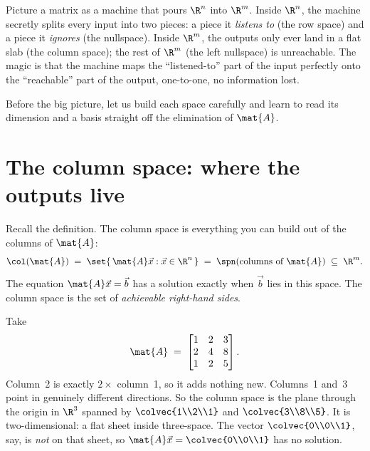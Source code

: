 \begin{intuitionbox}
Picture a matrix as a machine that pours $\R^n$ into $\R^m$. Inside $\R^n$, the machine secretly
splits every input into two pieces: a piece it \emph{listens to} (the row space) and a piece it
\emph{ignores} (the nullspace). Inside $\R^m$, the outputs only ever land in a flat slab (the
column space); the rest of $\R^m$ (the left nullspace) is unreachable. The magic is that the
machine maps the ``listened-to'' part of the input perfectly onto the ``reachable'' part of the
output, one-to-one, no information lost.
\end{intuitionbox}

Before the big picture, let us build each space carefully and learn to read its dimension and a
basis straight off the elimination of $\mat{A}$.

\section{The column space: where the outputs live}

Recall the definition. The column space is everything you can build out of the columns of
$\mat{A}$:
\[
  \col(\mat{A}) \;=\; \set{\,\mat{A}\vec{x} : \vec{x}\in\R^n\,}
  \;=\; \spn(\text{columns of }\mat{A}) \;\subseteq\; \R^m.
\]
The equation $\mat{A}\vec{x}=\vec{b}$ has a solution exactly when $\vec{b}$ lies in this space.
The column space is the set of \emph{achievable right-hand sides}.

\begin{example}\label{ch15:colspace-rank2}
Take
\[
  \mat{A} \;=\;
  \begin{bmatrix} 1 & 2 & 3\\ 2 & 4 & 8\\ 1 & 2 & 5 \end{bmatrix}.
\]
Column~2 is exactly $2\times$ column~1, so it adds nothing new. Columns~1 and~3 point in genuinely
different directions. So the column space is the plane through the origin in $\R^3$ spanned by
$\colvec{1\\2\\1}$ and $\colvec{3\\8\\5}$. It is two-dimensional: a flat sheet inside three-space.
The vector $\colvec{0\\0\\1}$, say, is \emph{not} on that sheet, so $\mat{A}\vec{x}=\colvec{0\\0\\1}$
has no solution.
\end{example}

